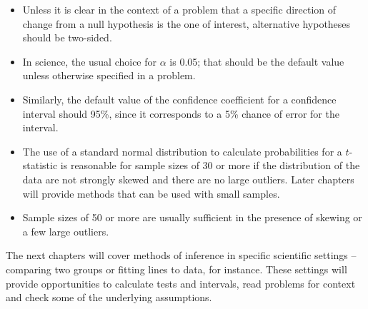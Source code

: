 \begin{spacing}{1.5}
\begin{itemize}
	
	\item Unless it is clear in the context of a problem that a specific direction of change from a null hypothesis is the one of interest, alternative hypotheses should be two-sided.
	
	\item In science, the usual choice for $\alpha$ is 0.05; that should be the default value unless otherwise specified in a problem.
	
	\item Similarly, the default value of the confidence coefficient for a confidence interval should 95\%, since it corresponds to a 5\% chance of error for the interval.
	
	\item The use of a standard normal distribution to calculate probabilities for a $t$-statistic is reasonable for sample sizes of 30 or more if the distribution of the data are not strongly skewed and there are no large outliers.  Later chapters will provide methods that can be used with small samples.
	
	\item Sample sizes of 50 or more are usually sufficient in the presence of skewing or a few large outliers.
		
\end{itemize}

The next chapters will cover methods of inference in specific scientific settings -- comparing two groups or fitting lines to data, for instance. These settings will provide opportunities to calculate tests and intervals, read problems for context and check some of the underlying assumptions.





\end{spacing}
 


